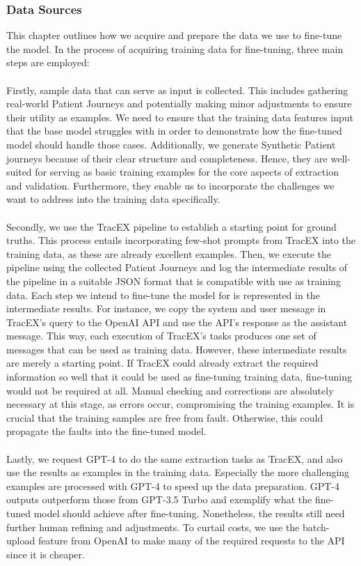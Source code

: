 \subsubsection{Data Sources}\label{sec:data_sources}
This chapter outlines how we acquire and prepare the data we use to fine-tune the model. In the process of acquiring training data for fine-tuning, three main steps are employed:\\\\
Firstly, sample data that can serve as input is collected. This includes gathering real-world Patient Journeys and potentially making minor adjustments to ensure their utility as examples. We need to ensure that the training data features input that the base model struggles with in order to demonstrate how the fine-tuned model should handle those cases. Additionally, we generate Synthetic Patient journeys because of their clear structure and completeness. Hence, they are well-suited for serving as basic training examples for the core aspects of extraction and validation. Furthermore, they enable us to incorporate the challenges we want to address into the training data specifically.\\\\
Secondly, we use the TracEX pipeline to establish a starting point for ground truths. This process entails incorporating few-shot prompts from TracEX into the training data, as these are already excellent examples. Then, we execute the pipeline using the collected Patient Journeys and log the intermediate results of the pipeline in a suitable JSON format that is compatible with use as training data. Each step we intend to fine-tune the model for is represented in the intermediate results. For instance, we copy the system and user message in TracEX's query to the OpenAI API and use the API's response as the assistant message. This way, each execution of TracEX's tasks produces one set of messages that can be used as training data. However, these intermediate results are merely a starting point. If TracEX could already extract the required information so well that it could be used as fine-tuning training data, fine-tuning would not be required at all. Manual checking and corrections are absolutely necessary at this stage, as errors occur, compromising the training examples. It is crucial that the training samples are free from fault. Otherwise, this could propagate the faults into the fine-tuned model. \\\\
Lastly, we request GPT-4 to do the same extraction tasks as TracEX, and also use the results as examples in the training data. Especially the more challenging examples are processed with GPT-4 to speed up the data preparation. GPT-4 outputs outperform those from GPT-3.5 Turbo and exemplify what the fine-tuned model should achieve after fine-tuning. Nonetheless, the results still need further human refining and adjustments. To curtail costs, we use the batch-upload feature from OpenAI to make many of the required requests to the API since it is cheaper.

